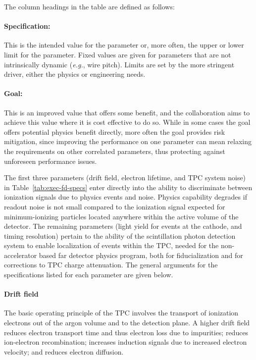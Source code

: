 The column headings in the table are defined as follows:
\paragraph{Specification:} This is the intended value for the parameter or, more often, the 
upper or lower limit for the parameter.  Fixed values are given for parameters that are not intrinsically dynamic ({\em e.g.}, wire pitch).  Limits are set by the more stringent driver, either
 the physics or engineering needs.

\paragraph{Goal:} This is an improved value that offers some benefit, and the collaboration
aims to achieve this value where it is cost effective to do so.  While in some cases the goal offers potential physics benefit directly, more often the goal provides risk mitigation, since improving the performance on one parameter can mean relaxing the requirements on other correlated parameters, thus protecting against unforeseen performance issues.

The first three parameters (drift field, electron lifetime, 
and TPC system noise) in Table~\ref{tab:exec-fd-specs} 
enter directly into the ability to discriminate between 
ionization signals due to physics events and noise.  Physics 
capability degrades if readout noise is not small compared to 
the ionization signal expected for minimum-ionizing particles
located anywhere within the active volume of the detector.
The remaining parameters (light yield for events at the cathode, 
and timing resolution) pertain to the ability 
of the scintillation photon detection system to enable 
localization of events within the TPC, needed for the 
non-accelerator based far detector physics program, both 
for fiducialization and for corrections to TPC charge 
attenuation.  The general 
arguments for the specifications listed for each parameter 
are given below.

\paragraph{Drift field}
The basic operating principle of the TPC involves the transport 
of ionization electrons out of the argon volume and to the 
detection plane.   
A higher drift field reduces electron transport time 
and thus electron loss due to impurities; 
reduces ion-electron recombination; increases induction 
signals due to increased electron velocity; and reduces 
electron diffusion.


